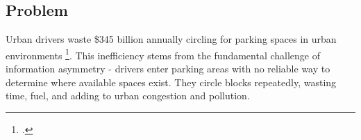 \subsection{Problem}
Urban drivers waste \$345 billion annually circling for parking spaces in urban environments \footcite{CHEM}. This inefficiency stems from the fundamental challenge of information asymmetry - drivers enter parking areas with no reliable way to determine where available spaces exist. They circle blocks repeatedly, wasting time, fuel, and adding to urban congestion and pollution.